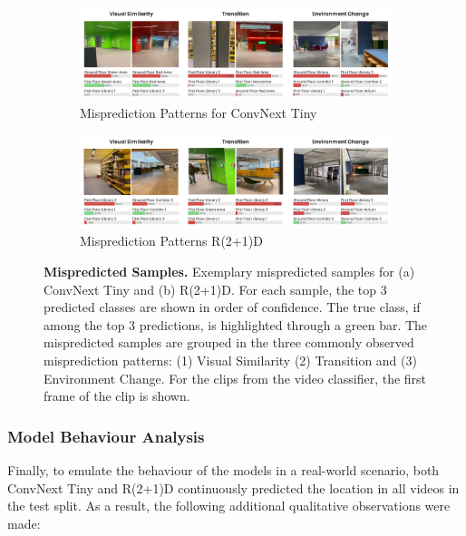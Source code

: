 \documentclass[a4paper]{article}
\begin{document}
\begin{figure}
\centering

\begin{subfigure}[b]{\textwidth}
\centering
\includegraphics[width=\textwidth]{./figures/mispredictions-convext-tiny.png}
\caption{Misprediction Patterns for ConvNext Tiny}
\end{subfigure}

\begin{subfigure}[b]{\textwidth}
\centering
\includegraphics[width=\textwidth]{./figures/mispredictions-r2plus1d.png}
\caption{Misprediction Patterns R(2+1)D}
\end{subfigure}

\caption{\textbf{Mispredicted Samples.} Exemplary mispredicted samples for (a)
  ConvNext Tiny and (b) R(2+1)D. For each sample, the top 3 predicted classes
  are shown in order of confidence. The true class, if among the top 3
  predictions, is highlighted through a green bar. The mispredicted samples are
  grouped in the three commonly observed misprediction patterns: (1) Visual
  Similarity (2) Transition and (3) Environment Change. For the clips from the
  video classifier, the first frame of the clip is shown.}
\label{fig:mispredictions}
\end{figure}


\subsubsection{Model Behaviour Analysis} %
\label{sub:behaviour}

Finally, to emulate the behaviour of the models in a real-world scenario, both
ConvNext Tiny and R(2+1)D continuously predicted the location in all videos in
the test split. As a result, the following additional qualitative observations
were made:
\end{document}
